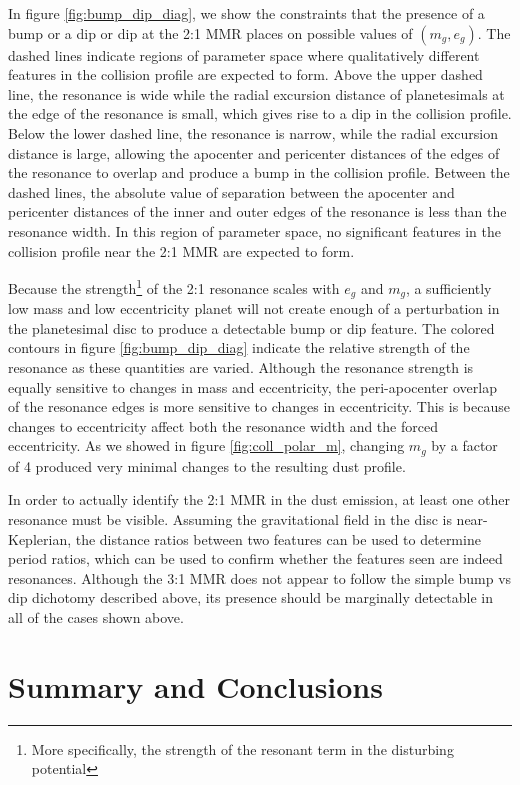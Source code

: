 \documentclass[fleqn,usenatbib]{mnras}
\begin{document}
In figure \ref{fig:bump_dip_diag}, we show the constraints that the presence of a bump or a dip or dip at the 2:1 MMR places on possible values of $(m_{g}, e_{g})$. The dashed
lines indicate regions of parameter space where qualitatively different features in the collision profile are expected to form. Above the upper dashed line, the 
resonance is wide while the radial excursion distance of planetesimals at the edge of the resonance is small, which gives rise to a dip in the collision profile. 
Below the lower dashed line, the resonance is narrow, while the radial excursion distance is large, allowing the apocenter and pericenter distances of the edges 
of the resonance to overlap and produce a bump in the collision profile. Between the dashed lines, the absolute value of separation between the apocenter and 
pericenter distances of the inner and outer edges of the resonance is less than the resonance width. In this region of parameter space, no significant features in 
the collision profile near the 2:1 MMR are expected to form. 

Because the strength\footnote{More specifically, the strength of the resonant term in the disturbing potential} of the 2:1 resonance scales with $e_{g}$ and  $m_{g}$, a sufficiently low mass and low eccentricity planet will not create 
enough of a perturbation in the planetesimal disc to produce a detectable bump or dip feature. The colored contours in figure \ref{fig:bump_dip_diag} 
indicate the relative strength of the resonance as these quantities are varied. Although the resonance strength is equally sensitive to changes in 
mass and eccentricity, the peri-apocenter overlap of the resonance edges is more sensitive to changes in eccentricity. This is because changes to 
eccentricity affect both the resonance width and the forced eccentricity. As we showed in figure \ref{fig:coll_polar_m}, changing $m_{g}$ by a factor 
of 4 produced very minimal changes to the resulting dust profile.

In order to actually identify the 2:1 MMR in the dust emission, at least one other resonance must be visible. Assuming the gravitational field in the 
disc is near-Keplerian, the distance ratios between two features can be used to determine period ratios, which can be used to confirm whether the 
features seen are indeed resonances. Although the 3:1 MMR does not appear to follow the simple bump vs dip dichotomy described above, its 
presence should be marginally detectable in all of the cases shown above.

\section{Summary and Conclusions}\label{sec:conclusions}
\end{document}

